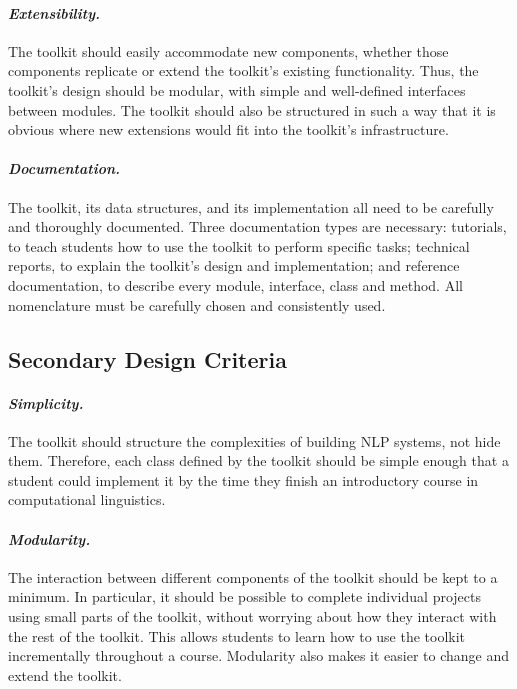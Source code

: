 \documentclass[11pt]{article}
\begin{document}
\paragraph{\textit{Extensibility.}} The toolkit should easily
accommodate new components, whether those components replicate or
extend the toolkit's existing functionality.  Thus, the toolkit's
design should be modular, with simple and well-defined interfaces
between modules.  The toolkit should also be structured in such a way
that it is obvious where new extensions would fit into the toolkit's
infrastructure.

\paragraph{\textit{Documentation.}} The toolkit, its data structures,
and its implementation all need to be carefully and thoroughly
documented.  Three documentation types are necessary: tutorials, to
teach students how to use the toolkit to perform specific tasks;
technical reports, to explain the toolkit's design and implementation;
and reference documentation, to describe every module, interface,
class and method.  All nomenclature must be carefully chosen and
consistently used.

\subsection{Secondary Design Criteria}

\paragraph{\textit{Simplicity.}} The toolkit should structure the
complexities of building NLP systems, not hide them.  Therefore, each
class defined by the toolkit should be simple enough that a student
could implement it by the time they finish an introductory course in
computational linguistics.

\paragraph{\textit{Modularity.}} The interaction between different
components of the toolkit should be kept to a minimum.  In particular,
it should be possible to complete individual projects using small
parts of the toolkit, without worrying about how they interact with
the rest of the toolkit.  This allows students to learn how to use the
toolkit incrementally throughout a course.  Modularity also makes it
easier to change and extend the toolkit.
\end{document}
